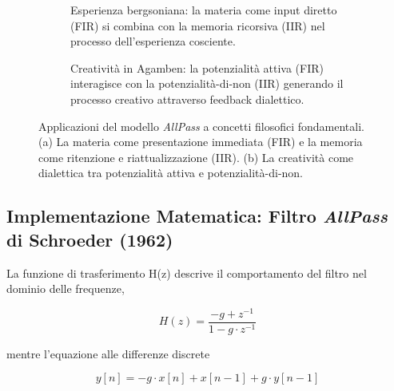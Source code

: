 \documentclass[12pt,a4paper]{article}
\begin{document}
\begin{figure}[htbp]
  \centering
  \begin{subfigure}[b]{0.48\textwidth}
    \centering
    \caption{Esperienza bergsoniana: la materia come input diretto (FIR) si combina con la memoria ricorsiva (IIR) nel processo dell'esperienza cosciente.}
    \label{esperienza}
  \end{subfigure}
  \hfill
  \begin{subfigure}[b]{0.48\textwidth}
    \centering
    \caption{Creatività in Agamben: la potenzialità attiva (FIR) interagisce con la potenzialità-di-non (IIR) generando il processo creativo attraverso feedback dialettico.}
    \label{creativita}
  \end{subfigure}
  \caption{Applicazioni del modello \emph{AllPass} a concetti filosofici fondamentali. (a) La materia come presentazione immediata (FIR) e la memoria come ritenzione e riattualizzazione (IIR). (b) La creatività come dialettica tra potenzialità attiva e potenzialità-di-non.}
  \label{fig:filosofia}
\end{figure}

\clearpage

\subsection*{Implementazione Matematica: Filtro \emph{AllPass} di Schroeder (1962)}

La funzione di trasferimento H(z) descrive il comportamento del filtro nel dominio delle frequenze,

\begin{equation}
  H(z) = \frac{-g + z^{-1}}{1 - g \cdot z^{-1}}
  \label{transfer}
\end{equation}

mentre l'equazione alle differenze discrete

\begin{equation}
  y[n] = -g \cdot x[n] + x[n-1] + g \cdot y[n-1]
  \label{difference}
\end{equation}
\end{document}
